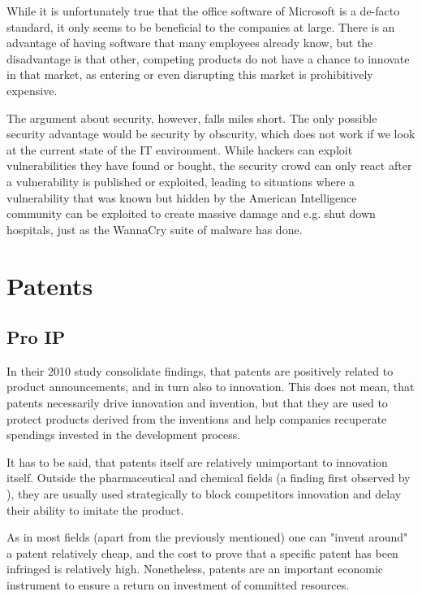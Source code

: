 \documentclass[a4paper]{report}
\begin{document}
While it is unfortunately true that the office software of Microsoft is a de-facto standard, it only seems to be beneficial to the companies at large. There is an advantage of having software that many employees already know, but the disadvantage is that other, competing products do not have a chance to innovate in that market, as entering or even disrupting this market is prohibitively expensive.

The argument about security, however, falls miles short. The only possible security advantage would be security by obscurity, which does not work if we look at the current state of the IT environment. While hackers can exploit vulnerabilities they have found or bought, the security crowd can only react after a vulnerability is published or exploited, leading to situations where a vulnerability that was known but hidden by the American Intelligence community can be exploited to create massive damage and e.g. shut down hospitals, just as the WannaCry suite of malware has done.

\section{Patents}
\label{sec:DiscPatents}

\subsection{Pro IP}
\label{ssec:ProIPPatents}
In their 2010 study \citeauthor{Artz2010} consolidate findings, that patents are positively related to product announcements, and in turn also to innovation. This does not mean, that patents necessarily drive innovation and invention, but that they are used to protect products derived from the inventions and help companies recuperate spendings invested in the development process. 

It has to be said, that patents itself are relatively unimportant to innovation itself. Outside the pharmaceutical and chemical fields (a finding first observed by \citeauthor{Mansfield1986}), they are usually used strategically to block competitors innovation and delay their ability to imitate the product. 

As in most fields (apart from the previously mentioned) one can "invent around" a patent relatively cheap, and the cost to prove that a specific patent has been infringed is relatively high. Nonetheless, patents are an important economic instrument to ensure a return on investment of committed resources.
\end{document}
